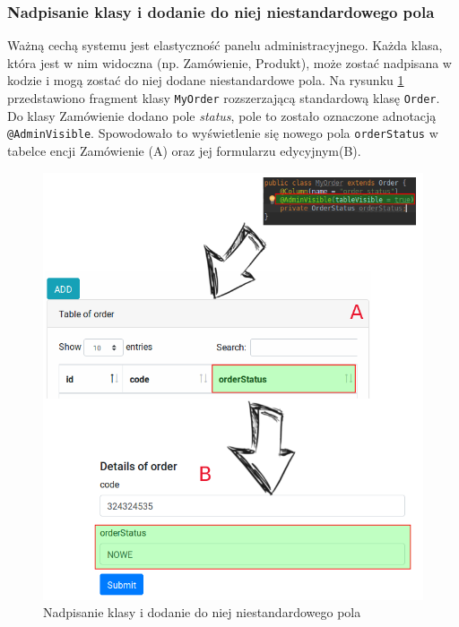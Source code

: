 \subsubsection{Nadpisanie klasy i dodanie do niej niestandardowego pola}
Ważną cechą systemu jest elastyczność panelu administracyjnego. Każda klasa, która jest w nim widoczna (np. Zamówienie, Produkt), może zostać nadpisana w kodzie i mogą zostać do niej dodane niestandardowe pola. Na rysunku \ref{nadpisanieklasyadmin} przedstawiono fragment klasy \texttt{MyOrder} rozszerzającą standardową klasę \texttt{Order}. Do klasy Zamówienie dodano pole \textit{status}, pole to zostało oznaczone adnotacją \texttt{@AdminVisible}. Spowodowało to wyświetlenie się nowego pola \texttt{orderStatus} w tabelce encji Zamówienie (A) oraz jej formularzu edycyjnym(B).  
\begin{figure}
	\begin{center}
		\includegraphics[scale=0.38]{nadpisanieKlasNaPolaWAdminie.png}
	\end{center}
	\caption{{\color{black}Nadpisanie klasy i dodanie do niej niestandardowego pola}} \label{nadpisanieklasyadmin}
\end{figure}

